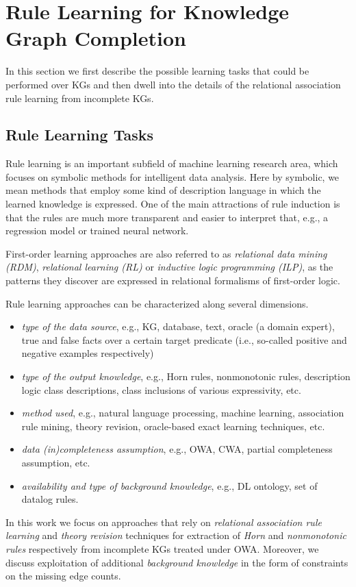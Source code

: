\section{ Rule Learning for Knowledge Graph Completion}
\label{sec:rules_kg_completion}
In this section we first describe the possible learning tasks that could be performed over KGs and then dwell into the details of the relational association rule learning from incomplete KGs. 
\subsection{Rule Learning Tasks}
Rule learning is an important subfield of machine learning research area, which focuses on symbolic methods for intelligent data analysis. Here by symbolic, we mean methods that employ some kind of description language in which the learned knowledge is expressed. One of the main attractions of rule induction is that the rules are much more transparent and easier to interpret that, e.g., a regression model or trained neural network.

First-order learning approaches are also referred to as \emph{relational data mining (RDM)}, \emph{relational learning
(RL)} or \emph{inductive logic programming (ILP)}, as the patterns they discover are expressed in
relational formalisms of first-order logic.

Rule learning approaches can be characterized along several dimensions. 
\begin{itemize}
\item \emph{type of the data source}, e.g., KG, database, text, oracle (a domain expert), true and false facts over a certain target predicate (i.e., so-called positive and negative examples respectively)
\item \emph{type of the output knowledge}, e.g., Horn rules, nonmonotonic rules, description logic class descriptions, class inclusions of various expressivity, etc.
\item \emph{method used}, e.g., natural language processing, machine learning, association rule mining, theory revision, oracle-based exact learning techniques, etc.
\item \emph{data (in)completeness assumption}, e.g., OWA, CWA, partial completeness assumption, etc.
\item \emph{availability and type of background knowledge}, e.g., DL ontology, set of datalog rules.
\end{itemize}

In this work we focus on approaches that rely on \emph{relational association rule learning} and \emph{theory revision} techniques for extraction of \emph{Horn} and \emph{nonmonotonic rules} respectively from incomplete KGs treated under OWA. Moreover, we discuss exploitation of additional \emph{background knowledge} in the form of constraints on the missing edge counts.

